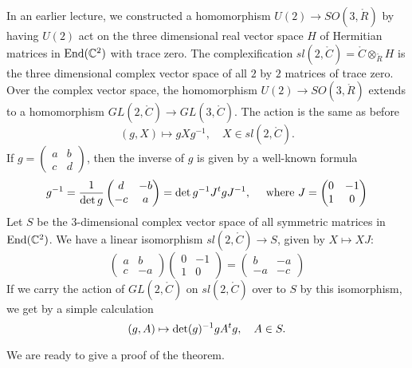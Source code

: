 \documentclass{amsart}
\def\t#1{\hbox{}^t#1}
\begin{document}
In an earlier lecture, we constructed a homomorphism $U(2)\to
SO(3,\ring{R})$ by having $U(2)$ act on the three dimensional real
vector space $H$ of Hermitian matrices in ${\operatorname{End}}(\mathbb{C}^2)$ with
trace zero.  The complexification
$sl(2,\ring{C})=\ring{C}\otimes_{\ring{R}} H$ is the three dimensional
complex vector space of all $2$ by $2$
matrices of trace zero.  Over the complex vector space, the
homomorphism $U(2)\to SO(3,\ring{R})$ extends to a homomorphism
$GL(2,\ring{C})\to GL(3,\ring{C})$.  The action is the same as before
\[
(g,X)\mapsto g X g^{-1},\quad X\in sl(2,\ring{C}).
\]
If $g = \begin{pmatrix} a& b\\ c & d\end{pmatrix}$, then the inverse
of $g$ is given by a well-known formula
\[
g^{-1} = \frac{1}{\det{g}}\begin{pmatrix} d & - b \\ -c & a\end{pmatrix} 
= \det g^{-1} J \t{g} J^{-1}, \quad
\hbox{ where } J = \begin{pmatrix} 0 & -1 \\ 1 &0 \end{pmatrix}
\]
Let $S$ be the $3$-dimensional complex vector space of all symmetric matrices in ${\operatorname{End}}(\mathbb{C}^2)$.
We have a linear isomorphism $sl(2,\ring{C})\to S$, given by $X\mapsto X J$:
\[
\begin{pmatrix} a& b\\c & -a\end{pmatrix} \begin{pmatrix} 0& -1 \\1 &0\end{pmatrix} = 
\begin{pmatrix} b & -a \\ -a & -c \end{pmatrix}
\]
If we carry the action of $GL(2,\ring{C})$ on $sl(2,\ring{C})$
over to $S$ by this isomorphism, we get by a simple calculation
\[
(g,A) \mapsto \det(g)^{-1} g A \t{g},\quad A \in S.
\]

We are ready to give a proof of the theorem.
\end{document}
